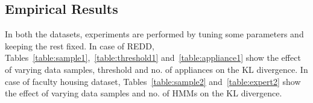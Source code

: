 \documentclass{sig-alternate}
\begin{document}


\subsection{Empirical Results}
In both the datasets, experiments are performed by tuning some parameters and keeping the rest fixed. In case of REDD, Tables~\ref{table:sample1},~\ref{table:threshold1} and~\ref{table:appliance1} show the effect of varying data samples, threshold and no. of appliances on the KL divergence.
In case of faculty housing dataset, Tables~\ref{table:sample2} and~\ref{table:expert2} show the effect of varying data samples and no. of HMMs on the KL divergence.


\end{document}
